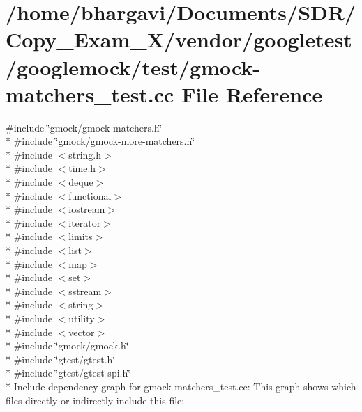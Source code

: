 \hypertarget{gmock-matchers__test_8cc}{}\section{/home/bhargavi/\+Documents/\+S\+D\+R/\+Copy\+\_\+\+Exam\+\_\+X/vendor/googletest/googlemock/test/gmock-\/matchers\+\_\+test.cc File Reference}
\label{gmock-matchers__test_8cc}
{\ttfamily \#include \char`\"{}gmock/gmock-\/matchers.\+h\char`\"{}}\\*
{\ttfamily \#include \char`\"{}gmock/gmock-\/more-\/matchers.\+h\char`\"{}}\\*
{\ttfamily \#include $<$string.\+h$>$}\\*
{\ttfamily \#include $<$time.\+h$>$}\\*
{\ttfamily \#include $<$deque$>$}\\*
{\ttfamily \#include $<$functional$>$}\\*
{\ttfamily \#include $<$iostream$>$}\\*
{\ttfamily \#include $<$iterator$>$}\\*
{\ttfamily \#include $<$limits$>$}\\*
{\ttfamily \#include $<$list$>$}\\*
{\ttfamily \#include $<$map$>$}\\*
{\ttfamily \#include $<$set$>$}\\*
{\ttfamily \#include $<$sstream$>$}\\*
{\ttfamily \#include $<$string$>$}\\*
{\ttfamily \#include $<$utility$>$}\\*
{\ttfamily \#include $<$vector$>$}\\*
{\ttfamily \#include \char`\"{}gmock/gmock.\+h\char`\"{}}\\*
{\ttfamily \#include \char`\"{}gtest/gtest.\+h\char`\"{}}\\*
{\ttfamily \#include \char`\"{}gtest/gtest-\/spi.\+h\char`\"{}}\\*
Include dependency graph for gmock-\/matchers\+\_\+test.cc\+:
This graph shows which files directly or indirectly include this file\+:
